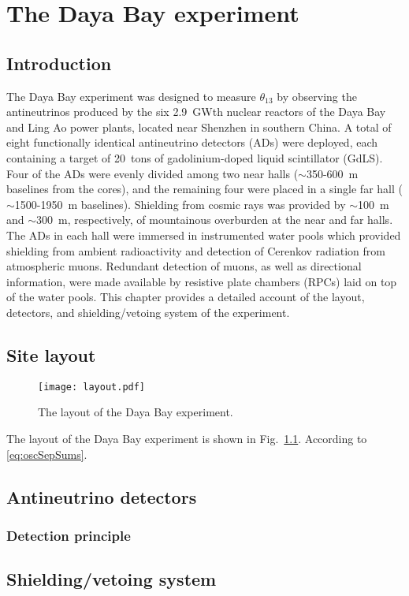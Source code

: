 \documentclass[../thesis.tex]{subfiles}
\begin{document}
\chapter{The Daya Bay experiment}
\label{chap:experim}

\section*{Introduction}

The Daya Bay experiment was designed to measure $\theta_{13}$ by observing the antineutrinos produced by the six 2.9~GWth nuclear reactors of the Daya Bay and Ling Ao power plants, located near Shenzhen in southern China. A total of eight functionally identical antineutrino detectors (ADs) were deployed, each containing a target of 20~tons of gadolinium-doped liquid scintillator (GdLS). Four of the ADs were evenly divided among two near halls ($\sim$350-600~m baselines from the cores), and the remaining four were placed in a single far hall ($\sim$1500-1950~m baselines). Shielding from cosmic rays was provided by $\sim$100~m and $\sim$300~m, respectively, of mountainous overburden at the near and far halls. The ADs in each hall were immersed in instrumented water pools which provided shielding from ambient radioactivity and detection of Cerenkov radiation from atmospheric muons. Redundant detection of muons, as well as directional information, were made available by resistive plate chambers (RPCs) laid on top of the water pools. This chapter provides a detailed account of the layout, detectors, and shielding/vetoing system of the experiment.

\section{Site layout}
\label{sec:expLayout}

\begin{figure}[ht]
  \label{fig:layout} 
  \texttt{[image: layout.pdf]}
  \caption{The layout of the Daya Bay experiment.}
\end{figure}

The layout of the Daya Bay experiment is shown in Fig.~\ref{fig:layout}. According to \eqref{eq:oscSepSums}.

\section{Antineutrino detectors}
\label{sec:expADs}

\subsection{Detection principle}
\label{sec:expDetPrinc}



\section{Shielding/vetoing system}
\label{sec:expShieldVeto}
\end{document}

